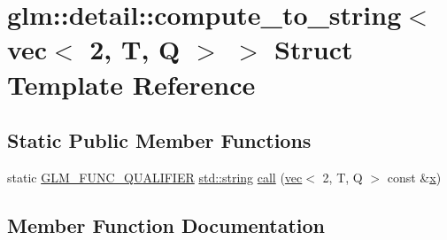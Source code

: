 \hypertarget{structglm_1_1detail_1_1compute__to__string_3_01vec_3_012_00_01_t_00_01_q_01_4_01_4}{}\section{glm\+:\+:detail\+:\+:compute\+\_\+to\+\_\+string$<$ vec$<$ 2, T, Q $>$ $>$ Struct Template Reference}
\label{structglm_1_1detail_1_1compute__to__string_3_01vec_3_012_00_01_t_00_01_q_01_4_01_4}
\subsection*{Static Public Member Functions}
\begin{DoxyCompactItemize}
\item 
static \mbox{\hyperlink{setup_8hpp_a33fdea6f91c5f834105f7415e2a64407}{G\+L\+M\+\_\+\+F\+U\+N\+C\+\_\+\+Q\+U\+A\+L\+I\+F\+I\+ER}} \mbox{\hyperlink{_s_d_l__opengl__glext_8h_ae84541b4f3d8e1ea24ec0f466a8c568b}{std\+::string}} \mbox{\hyperlink{structglm_1_1detail_1_1compute__to__string_3_01vec_3_012_00_01_t_00_01_q_01_4_01_4_a53a9c1f76338785f54bb2638b69517ef}{call}} (\mbox{\hyperlink{structglm_1_1vec}{vec}}$<$ 2, T, Q $>$ const \&\mbox{\hyperlink{_s_d_l__opengl_8h_ad0e63d0edcdbd3d79554076bf309fd47}{x}})
\end{DoxyCompactItemize}


\subsection{Member Function Documentation}
\mbox{\label{structglm_1_1detail_1_1compute__to__string_3_01vec_3_012_00_01_t_00_01_q_01_4_01_4_a53a9c1f76338785f54bb2638b69517ef}} 
